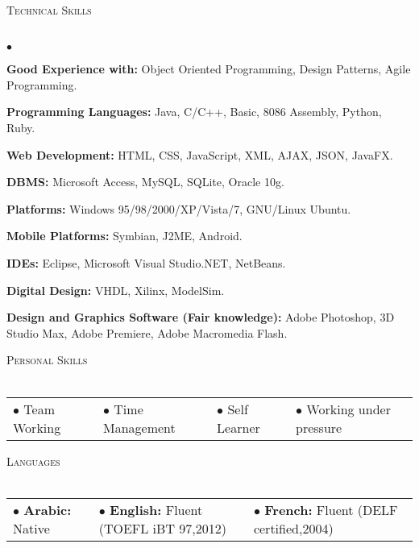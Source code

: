 \documentclass[letterpaper,12pt]{article}
\newcommand{\lineunder}{\vspace*{-8pt} \\ \hspace*{-8pt} \hrulefill \\}
\newcommand{\header}[1]{{\hspace*{0pt}\vspace*{6pt} \textsc{#1}} \vspace*{-6pt} \lineunder}
\newenvironment{achievements}{\begin{list}{$\bullet$}{\topsep 0pt \itemsep -2pt}}{\vspace*{4pt}\end{list}}
\begin{document}
\newpage

\header{Technical Skills}
\begin{achievements}
  \item \textbf{Good Experience with:} Object Oriented Programming, Design Patterns, Agile Programming.
  \item \textbf{Programming Languages:} Java, C/C++, Basic, 8086 Assembly, Python, Ruby.
  \item \textbf{Web Development:} HTML, CSS, JavaScript, XML, AJAX, JSON, JavaFX.
  \item \textbf{DBMS:} Microsoft Access, MySQL, SQLite, Oracle 10g.
  \item \textbf{Platforms:} Windows 95/98/2000/XP/Vista/7, GNU/Linux Ubuntu.
  \item \textbf{Mobile Platforms:} Symbian, J2ME, Android.
  \item \textbf{IDEs:} Eclipse, Microsoft Visual Studio.NET, NetBeans.
  \item \textbf{Digital Design:} VHDL, Xilinx, ModelSim.
  \item \textbf{Design and Graphics Software (Fair knowledge):} Adobe Photoshop, 3D Studio Max, Adobe Premiere, Adobe Macromedia Flash.
\end{achievements}
\vspace*{4pt}

\header{Personal Skills}
\begin{tabular}{l l l l}
$\bullet$ Team Working& 
$\bullet$ Time Management&
$\bullet$ Self Learner& 
$\bullet$ Working under pressure\\
\end{tabular}
\vspace*{4pt}

\header{Languages}
\begin{tabular}{l l l}
$\bullet$ \textbf{Arabic:} Native& 
$\bullet$ \textbf{English:} Fluent (TOEFL iBT 97,2012)&
$\bullet$ \textbf{French:} Fluent (DELF certified,2004)\\
\end{tabular}
\vspace*{4pt}
\end{document}
